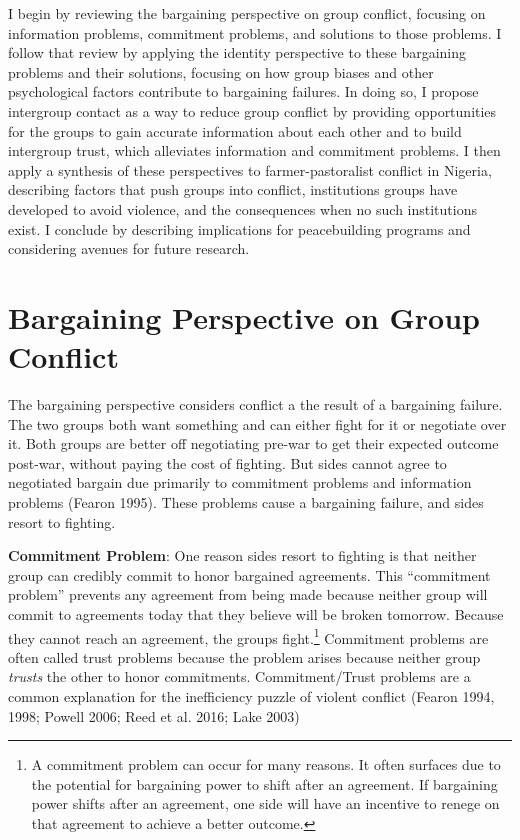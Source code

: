 \documentclass[11pt]{article}
\begin{document}
I begin by reviewing the bargaining perspective on group conflict,
focusing on information problems, commitment problems, and solutions to
those problems. I follow that review by applying the identity
perspective to these bargaining problems and their solutions, focusing
on how group biases and other psychological factors contribute to
bargaining failures. In doing so, I propose intergroup contact as a way
to reduce group conflict by providing opportunities for the groups to
gain accurate information about each other and to build intergroup
trust, which alleviates information and commitment problems. I then
apply a synthesis of these perspectives to farmer-pastoralist conflict
in Nigeria, describing factors that push groups into conflict,
institutions groups have developed to avoid violence, and the
consequences when no such institutions exist. I conclude by describing
implications for peacebuilding programs and considering avenues for
future research.

\hypertarget{bargaining-perspective-on-group-conflict}{%
\section{Bargaining Perspective on Group
Conflict}\label{bargaining-perspective-on-group-conflict}}

The bargaining perspective considers conflict a the result of a
bargaining failure. The two groups both want something and can either
fight for it or negotiate over it. Both groups are better off
negotiating pre-war to get their expected outcome post-war, without
paying the cost of fighting. But sides cannot agree to negotiated
bargain due primarily to commitment problems and information problems
(Fearon 1995). These problems cause a bargaining failure, and sides
resort to fighting.\newline

\noindent \textbf{Commitment Problem}: One reason sides resort to
fighting is that neither group can credibly commit to honor bargained
agreements. This ``commitment problem'' prevents any agreement from
being made because neither group will commit to agreements today that
they believe will be broken tomorrow. Because they cannot reach an
agreement, the groups fight.\footnote{A commitment problem can occur for
  many reasons. It often surfaces due to the potential for bargaining
  power to shift after an agreement. If bargaining power shifts after an
  agreement, one side will have an incentive to renege on that agreement
  to achieve a better outcome.} Commitment problems are often called
trust problems because the problem arises because neither group
\emph{trusts} the other to honor commitments. Commitment/Trust problems
are a common explanation for the inefficiency puzzle of violent conflict
(Fearon 1994, 1998; Powell 2006; Reed et al. 2016; Lake 2003)
\end{document}
